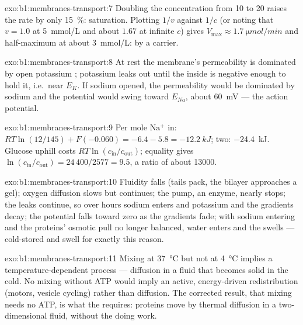 \begin{solution}{exo:b1:membranes-transport:7}
Doubling the concentration from 10 to 20 raises the rate by only
\qty{15}{\%}: saturation. Plotting $1/v$ against $1/c$ (or noting that
$v = 1.0$ at \qty{5}{mmol/L} and about $1.67$ at infinite $c$) gives
$V_{\max} \approx \qty{1.7}{\micro mol/min}$ and half-maximum at about
\qty{3}{mmol/L}:  by a carrier.
\end{solution}

\begin{solution}{exo:b1:membranes-transport:8}
At rest the membrane's permeability is dominated by open potassium
; potassium leaks out until the inside is negative enough to
hold it, i.e.\ near $E_K$. If sodium  opened, the permeability
would be dominated by sodium and the potential would swing toward
$E_{Na}$, about \qty{+60}{mV} --- the action potential.
\end{solution}

\begin{solution}{exo:b1:membranes-transport:9}
Per mole $\mathrm{Na^+}$ in: $RT\ln(12/145) + F(-0.060) = -6.4 - 5.8
= \qty{-12.2}{kJ}$; two: \qty{-24.4}{kJ}. Glucose uphill costs
$RT\ln(c_{\text{in}}/c_{\text{out}})$; equality gives
$\ln(c_{\text{in}}/c_{\text{out}}) = 24\,400/2577 = 9.5$, a ratio of
about \num{13000}.
\end{solution}

\begin{solution}{exo:b1:membranes-transport:10}
Fluidity falls (tails pack, the bilayer approaches a gel); oxygen
diffusion slows but continues; the pump, an enzyme, nearly stops;
the leaks continue, so over hours sodium enters and potassium 
and the gradients decay; the potential falls toward zero as the
gradients fade; with sodium entering and the proteins' osmotic pull no
longer balanced, water enters and the  swells --- cold-stored 
and  swell for exactly this reason.
\end{solution}

\begin{solution}{exo:b1:membranes-transport:11}
Mixing at \qty{37}{\celsius} but not at \qty{4}{\celsius} implies a
temperature-dependent process --- diffusion in a fluid that becomes
solid in the cold. No mixing without ATP would imply an active,
energy-driven redistribution (motors, vesicle cycling) rather than
diffusion. The corrected result, that mixing needs no ATP, is what the
 requires: proteins move by thermal diffusion in a
two-dimensional fluid, without the  doing work.
\end{solution}

